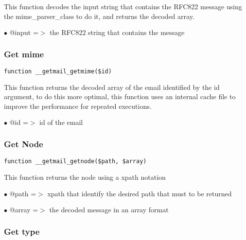 \documentclass[a4paper]{article}
\begin{document}
This function decodes the input string that contains the RFC822 message
using the mime\_parser\_class to do it, and returns the decoded array.

\begin{compactitem}
\item[\color{myblue}$\bullet$] @input =$>$ the RFC822 string that contains the message
\end{compactitem}

\hypertarget{toc39}{}
\subsubsection{Get mime}

\begin{lstlisting}
function __getmail_getmime($id)
\end{lstlisting}

This function returns the decoded array of the email identified by the id
argument, to do this more optimal, this function uses an internal cache
file to improve the performance for repeated executions.

\begin{compactitem}
\item[\color{myblue}$\bullet$] @id =$>$ id of the email
\end{compactitem}

\hypertarget{toc40}{}
\subsubsection{Get Node}

\begin{lstlisting}
function __getmail_getnode($path, $array)
\end{lstlisting}

This function returns the node using a xpath notation

\begin{compactitem}
\item[\color{myblue}$\bullet$] @path  =$>$ xpath that identify the desired path that must to be returned
\item[\color{myblue}$\bullet$] @array =$>$ the decoded message in an array format
\end{compactitem}

\hypertarget{toc41}{}
\subsubsection{Get type}
\end{document}
